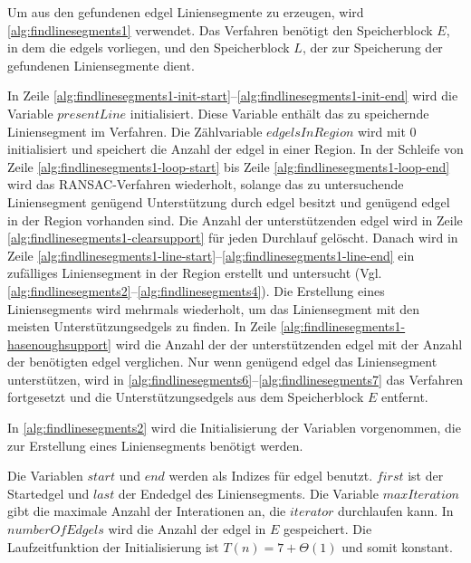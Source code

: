 Um aus den gefundenen \gls{edgel} Liniensegmente zu erzeugen, wird \autoref{alg:findlinesegments1} verwendet. Das
 Verfahren benötigt den Speicherblock $E$, in dem die \glspl{edgel} vorliegen, und den Speicherblock $L$, der zur
 Speicherung der gefundenen Liniensegmente dient.

In Zeile \ref{alg:findlinesegments1-init-start}--\ref{alg:findlinesegments1-init-end} wird die Variable
 $\mathit{presentLine}$ initialisiert. Diese Variable enthält das zu speichernde Liniensegment im Verfahren.
 Die Zählvariable $\mathit{edgelsInRegion}$ wird mit $0$ initialisiert und speichert die Anzahl der \gls{edgel} in
 einer Region. In der Schleife von Zeile \ref{alg:findlinesegments1-loop-start} bis Zeile
 \ref{alg:findlinesegments1-loop-end} wird das RANSAC-Verfahren wiederholt, solange das zu untersuchende Liniensegment
 genügend Unterstützung durch \gls{edgel} besitzt und genügend \gls{edgel} in der Region vorhanden sind. Die Anzahl der
 unterstützenden \gls{edgel} wird in Zeile \ref{alg:findlinesegments1-clearsupport} für jeden Durchlauf gelöscht.
 Danach wird in Zeile \ref{alg:findlinesegments1-line-start}--\ref{alg:findlinesegments1-line-end} ein zufälliges
 Liniensegment in der Region erstellt und untersucht
 (Vgl. \autoref{alg:findlinesegments2}--\autoref{alg:findlinesegments4}). Die Erstellung eines Liniensegments wird
 mehrmals wiederholt, um das Liniensegment mit den meisten Unterstützungsedgels zu finden. In Zeile
 \ref{alg:findlinesegments1-hasenoughsupport} wird die Anzahl der der unterstützenden \gls{edgel} mit der Anzahl der
 benötigten \gls{edgel} verglichen. Nur wenn genügend \gls{edgel} das Liniensegment unterstützen, wird in
 \autoref{alg:findlinesegments6}--\autoref{alg:findlinesegments7} das Verfahren fortgesetzt und die
 Unterstützungsedgels aus dem Speicherblock $E$ entfernt.

In \autoref{alg:findlinesegments2} wird die Initialisierung der Variablen vorgenommen, die zur Erstellung eines
 Liniensegments benötigt werden.

Die Variablen $\mathit{start}$ und $\mathit{end}$ werden als Indizes für \gls{edgel} benutzt. $\mathit{first}$ ist der
 Startedgel und $\mathit{last}$ der Endedgel des Liniensegments. Die Variable $\mathit{maxIteration}$ gibt die maximale
 Anzahl der Interationen an, die $\mathit{iterator}$ durchlaufen kann. In $\mathit{numberOfEdgels}$ wird die Anzahl der
 \gls{edgel} in $E$ gespeichert. Die Laufzeitfunktion der Initialisierung ist $T(n) = 7 + \Theta(1)$ und somit
  konstant.

